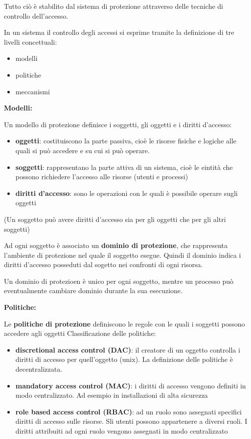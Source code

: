 \documentclass{article}
\begin{document}
Tutto ciò è stabilito dal sistema di protezione attraverso delle tecniche di controllo dell'accesso.

In un sistema il controllo degli accessi si esprime tramite la definizione di tre livelli concettuali:
\begin{itemize}
    \item modelli
    \item politiche
    \item meccanismi
\end{itemize}

\vspace{3mm}
\textbf{Modelli:}

Un modello di protezione definisce i soggetti, gli oggetti e i diritti d'accesso:
\begin{itemize}
    \item \textbf{oggetti}: costituiscono la parte passiva, cioè le risorse fisiche e logiche alle quali si può accedere e su cui si può operare.
    \item \textbf{soggetti}: rappresentano la parte attiva di un sistema, cioè le eintità che possono richiedere l'accesso alle risorse (utenti e processi)
    \item \textbf{diritti d'accesso}: sono le operazioni con le quali è possibile operare sugli oggetti
\end{itemize}

(Un soggetto può avere diritti d'accesso sia per gli oggetti che per gli altri soggetti)

Ad ogni soggetto è associato un \textbf{dominio di protezione}, che rappresenta l'ambiente di protezione nel quale il soggetto esegue. Quindi il dominio
indica i diritti d'accesso posseduti dal sogetto nei confronti di ogni risorsa.

Un dominio di protezioen è unico per ogni soggetto, mentre un processo può eventualmente cambiare dominio durante la sua esecuzione.

\vspace{3mm}
\textbf{Politiche:}

Le \textbf{politiche di protezione} definiscono le regole con le quali i soggetti possono accedere agli oggetti
Classificazione delle politiche:
\begin{itemize}
    \item \textbf{discretional access control (DAC)}: il creatore di un oggetto controlla i diritti di accesso per quell'oggetto (unix). La definizione delle politiche è
    decentralizzata.
    \item \textbf{mandatory access control (MAC)}: i diritti di accesso vengono definiti in modo centralizzato. Ad esempio in installazioni di alta sicurezza
    \item \textbf{role based access control (RBAC)}: ad un ruolo sono assegnati specifici diritti di accesso sulle risorse. Sli utenti possono appartenere a diversi
    ruoli. I diritti attribuiti ad ogni ruolo vengono assegnati in modo centralizzato
\end{itemize}
\end{document}
